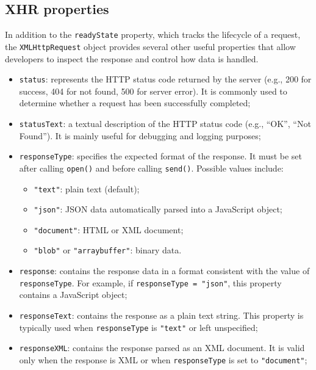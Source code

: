 \documentclass{scrbook}
\begin{document}
	\subsection{XHR properties}
	
	In addition to the \texttt{readyState} property, which tracks the lifecycle of a request, the \texttt{XMLHttpRequest} object provides several other useful properties that allow developers to inspect the response and control how data is handled.
	
	\begin{itemize}
		\item \texttt{status}: represents the HTTP status code returned by the server (e.g., 200 for success, 404 for not found, 500 for server error). It is commonly used to determine whether a request has been successfully completed;
		
		\item \texttt{statusText}: a textual description of the HTTP status code (e.g., ``OK'', ``Not Found''). It is mainly useful for debugging and logging purposes;
		
		\item \texttt{responseType}: specifies the expected format of the response. It must be set after calling \texttt{open()} and before calling \texttt{send()}. Possible values include:
		\begin{itemize}
			\item \texttt{"text"}: plain text (default);
			\item \texttt{"json"}: JSON data automatically parsed into a JavaScript object;
			\item \texttt{"document"}: HTML or XML document;
			\item \texttt{"blob"} or \texttt{"arraybuffer"}: binary data.
		\end{itemize}
		
		\item \texttt{response}: contains the response data in a format consistent with the value of \texttt{responseType}. For example, if \texttt{responseType = "json"}, this property contains a JavaScript object;
		
		\item \texttt{responseText}: contains the response as a plain text string. This property is typically used when \texttt{responseType} is \texttt{"text"} or left unspecified;
		
		\item \texttt{responseXML}: contains the response parsed as an XML document. It is valid only when the response is XML or when \texttt{responseType} is set to \texttt{"document"};
		

\end{itemize}
\end{document}
